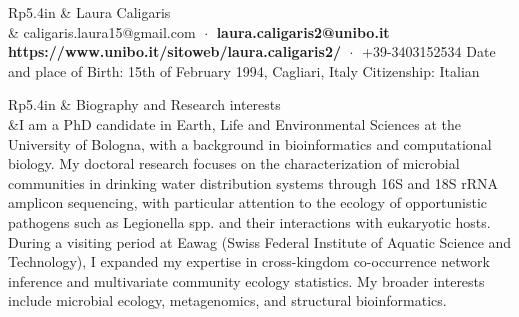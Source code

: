 \documentclass[letterpaper, 11pt]{article}
\newcommand{\headingfont}{\Large\color{OliveGreen}}
\newenvironment{SectionTable}[1]{
	\renewcommand*{\arraystretch}{1.7}
	\setlength{\tabcolsep}{10pt}
	\begin{longtable}{Rp{5.4in}} & #1 \\}
{\end{longtable}\vspace{-.3cm}}
\begin{document}

\begin{SectionTable}{\Huge Laura Caligaris} & 
caligaris.laura15@gmail.com $\;\boldsymbol{\cdot}\;$
\textbf{laura.caligaris2@unibo.it} \newline 
\textbf{https://www.unibo.it/sitoweb/laura.caligaris2/} $\;\boldsymbol{\cdot}\;$ 
+39-3403152534 \newline
Date and place of Birth: 15th of February 1994, Cagliari, Italy \newline
Citizenship: Italian
\end{SectionTable}


\begin{SectionTable}{\headingfont Biography and Research interests}
&I am a PhD candidate in Earth, Life and Environmental Sciences at the University of Bologna, with a background in bioinformatics and computational biology. My doctoral research focuses on the characterization of microbial communities in drinking water distribution systems through 16S and 18S rRNA amplicon sequencing, with particular attention to the ecology of opportunistic pathogens such as Legionella spp. and their interactions with eukaryotic hosts. During a visiting period at Eawag (Swiss Federal Institute of Aquatic Science and Technology), I expanded my expertise in cross-kingdom co-occurrence network inference and multivariate community ecology statistics. My broader interests include microbial ecology, metagenomics, and structural bioinformatics.
\end{SectionTable}

\end{document}
